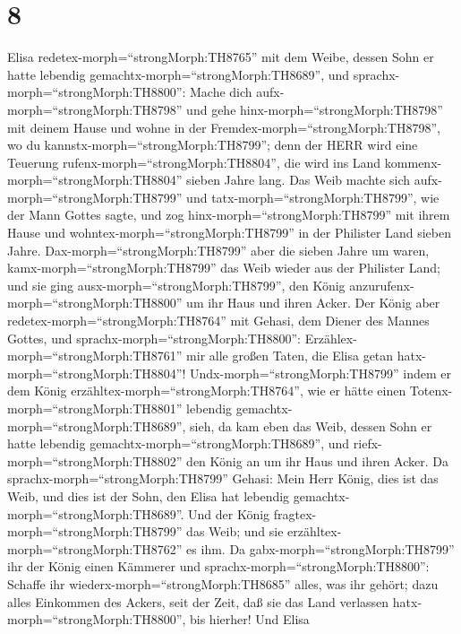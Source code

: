 \hypertarget{section-7}{%
\section{8}\label{section-7}}

 Elisa redetex-morph=``strongMorph:TH8765'' mit dem Weibe,
dessen Sohn er hatte lebendig gemachtx-morph=``strongMorph:TH8689'', und
sprachx-morph=``strongMorph:TH8800'': Mache dich
aufx-morph=``strongMorph:TH8798'' und gehe
hinx-morph=``strongMorph:TH8798'' mit deinem Hause und wohne in der
Fremdex-morph=``strongMorph:TH8798'', wo du
kannstx-morph=``strongMorph:TH8799''; denn der HERR wird eine Teuerung
rufenx-morph=``strongMorph:TH8804'', die wird ins Land
kommenx-morph=``strongMorph:TH8804'' sieben Jahre lang.  Das
Weib machte sich aufx-morph=``strongMorph:TH8799'' und
tatx-morph=``strongMorph:TH8799'', wie der Mann Gottes sagte, und zog
hinx-morph=``strongMorph:TH8799'' mit ihrem Hause und
wohntex-morph=``strongMorph:TH8799'' in der Philister Land sieben Jahre.
 Dax-morph=``strongMorph:TH8799'' aber die sieben Jahre um
waren, kamx-morph=``strongMorph:TH8799'' das Weib wieder aus der
Philister Land; und sie ging ausx-morph=``strongMorph:TH8799'', den
König anzurufenx-morph=``strongMorph:TH8800'' um ihr Haus und ihren
Acker.  Der König aber redetex-morph=``strongMorph:TH8764''
mit Gehasi, dem Diener des Mannes Gottes, und
sprachx-morph=``strongMorph:TH8800'':
Erzählex-morph=``strongMorph:TH8761'' mir alle großen Taten, die Elisa
getan hatx-morph=``strongMorph:TH8804''! 
Undx-morph=``strongMorph:TH8799'' indem er dem König
erzähltex-morph=``strongMorph:TH8764'', wie er hätte einen
Totenx-morph=``strongMorph:TH8801'' lebendig
gemachtx-morph=``strongMorph:TH8689'', sieh, da kam eben das Weib,
dessen Sohn er hatte lebendig gemachtx-morph=``strongMorph:TH8689'', und
riefx-morph=``strongMorph:TH8802'' den König an um ihr Haus und ihren
Acker. Da sprachx-morph=``strongMorph:TH8799'' Gehasi: Mein Herr König,
dies ist das Weib, und dies ist der Sohn, den Elisa hat lebendig
gemachtx-morph=``strongMorph:TH8689''.  Und der König
fragtex-morph=``strongMorph:TH8799'' das Weib; und sie
erzähltex-morph=``strongMorph:TH8762'' es ihm. Da
gabx-morph=``strongMorph:TH8799'' ihr der König einen Kämmerer und
sprachx-morph=``strongMorph:TH8800'': Schaffe ihr
wiederx-morph=``strongMorph:TH8685'' alles, was ihr gehört; dazu alles
Einkommen des Ackers, seit der Zeit, daß sie das Land verlassen
hatx-morph=``strongMorph:TH8800'', bis hierher!  Und Elisa

